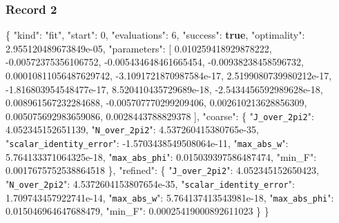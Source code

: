 \documentclass[
  10pt,
]{article}
\newenvironment{Shaded}{}{}
\newcommand{\DataTypeTok}[1]{\textcolor[rgb]{0.56,0.13,0.00}{#1}}
\newcommand{\DecValTok}[1]{\textcolor[rgb]{0.25,0.63,0.44}{#1}}
\newcommand{\FloatTok}[1]{\textcolor[rgb]{0.25,0.63,0.44}{#1}}
\newcommand{\FunctionTok}[1]{\textcolor[rgb]{0.02,0.16,0.49}{#1}}
\newcommand{\KeywordTok}[1]{\textcolor[rgb]{0.00,0.44,0.13}{\textbf{#1}}}
\newcommand{\OtherTok}[1]{\textcolor[rgb]{0.00,0.44,0.13}{#1}}
\newcommand{\StringTok}[1]{\textcolor[rgb]{0.25,0.44,0.63}{#1}}
\begin{document}
\hypertarget{record-2}{%
\subsubsection{Record 2}\label{record-2}}

\begin{Shaded}
\begin{Highlighting}[]
\FunctionTok{\{}
  \DataTypeTok{"kind"}\FunctionTok{:} \StringTok{"fit"}\FunctionTok{,}
  \DataTypeTok{"start"}\FunctionTok{:} \DecValTok{0}\FunctionTok{,}
  \DataTypeTok{"evaluations"}\FunctionTok{:} \DecValTok{6}\FunctionTok{,}
  \DataTypeTok{"success"}\FunctionTok{:} \KeywordTok{true}\FunctionTok{,}
  \DataTypeTok{"optimality"}\FunctionTok{:} \FloatTok{2.955120489673849e{-}05}\FunctionTok{,}
  \DataTypeTok{"parameters"}\FunctionTok{:} \OtherTok{[}
    \FloatTok{0.010259418929878222}\OtherTok{,}
    \FloatTok{{-}0.00572375356106752}\OtherTok{,}
    \FloatTok{{-}0.005434648461665454}\OtherTok{,}
    \FloatTok{{-}0.00938238458596732}\OtherTok{,}
    \FloatTok{0.00010811056487629742}\OtherTok{,}
    \FloatTok{{-}3.1091721870987584e{-}17}\OtherTok{,}
    \FloatTok{2.5199080739980212e{-}17}\OtherTok{,}
    \FloatTok{{-}1.816803954548477e{-}17}\OtherTok{,}
    \FloatTok{8.520410435729689e{-}18}\OtherTok{,}
    \FloatTok{{-}2.5434456592989628e{-}18}\OtherTok{,}
    \FloatTok{0.008961567232284688}\OtherTok{,}
    \FloatTok{{-}0.005707770299209406}\OtherTok{,}
    \FloatTok{0.002610213628856309}\OtherTok{,}
    \FloatTok{0.005075692983659086}\OtherTok{,}
    \FloatTok{0.0028443788829378}
  \OtherTok{]}\FunctionTok{,}
  \DataTypeTok{"coarse"}\FunctionTok{:} \FunctionTok{\{}
    \DataTypeTok{"\nolinkurl{J_over_2pi2}"}\FunctionTok{:} \FloatTok{4.052345152651139}\FunctionTok{,}
    \DataTypeTok{"\nolinkurl{N_over_2pi2}"}\FunctionTok{:} \FloatTok{4.537260415380765e{-}35}\FunctionTok{,}
    \DataTypeTok{"\nolinkurl{scalar_identity_error}"}\FunctionTok{:} \FloatTok{{-}1.5703438549508064e{-}11}\FunctionTok{,}
    \DataTypeTok{"\nolinkurl{max_abs_w}"}\FunctionTok{:} \FloatTok{5.764133371064325e{-}18}\FunctionTok{,}
    \DataTypeTok{"\nolinkurl{max_abs_phi}"}\FunctionTok{:} \FloatTok{0.015039397586487474}\FunctionTok{,}
    \DataTypeTok{"min\_F"}\FunctionTok{:} \FloatTok{0.0017675752538864518}
  \FunctionTok{\},}
  \DataTypeTok{"refined"}\FunctionTok{:} \FunctionTok{\{}
    \DataTypeTok{"\nolinkurl{J_over_2pi2}"}\FunctionTok{:} \FloatTok{4.052345152650423}\FunctionTok{,}
    \DataTypeTok{"\nolinkurl{N_over_2pi2}"}\FunctionTok{:} \FloatTok{4.5372604153807654e{-}35}\FunctionTok{,}
    \DataTypeTok{"\nolinkurl{scalar_identity_error}"}\FunctionTok{:} \FloatTok{1.709743457922741e{-}14}\FunctionTok{,}
    \DataTypeTok{"\nolinkurl{max_abs_w}"}\FunctionTok{:} \FloatTok{5.764137413543981e{-}18}\FunctionTok{,}
    \DataTypeTok{"\nolinkurl{max_abs_phi}"}\FunctionTok{:} \FloatTok{0.015046964647688479}\FunctionTok{,}
    \DataTypeTok{"min\_F"}\FunctionTok{:} \FloatTok{0.00025419000892611023}
  \FunctionTok{\}}
\FunctionTok{\}}
\end{Highlighting}
\end{Shaded}
\end{document}
